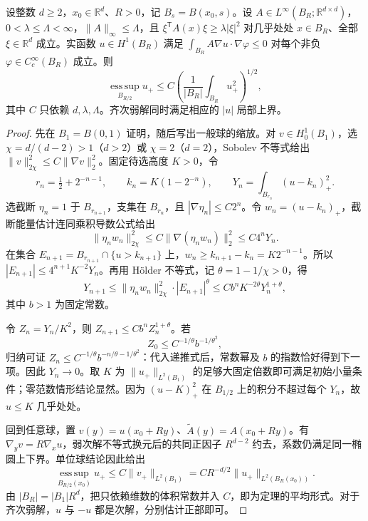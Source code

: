 \begin{theorem}[弱次解的局部上界]
\label{b2:thm:16-local-boundedness}
设整数 \(d\geq2\)，\(x_0\in\mathbb R^d\)、\(R>0\)，记 \(B_s=B(x_0,s)\)。设 \(A\in L^\infty(B_R;\mathbb R^{d\times d})\)，\(0<\lambda\leq\Lambda<\infty\)，\(\|A\|_\infty\leq\Lambda\)，且 \(\xi^{\mathsf T}A(x)\xi\geq\lambda|\xi|^2\) 对几乎处处 \(x\in B_R\)、全部 \(\xi\in\mathbb R^d\) 成立。实函数 \(u\in H^1(B_R)\) 满足 \(\int_{B_R}A\nabla u\cdot\nabla\varphi\leq0\) 对每个非负 \(\varphi\in C_c^\infty(B_R)\) 成立。则
\[\operatorname*{ess\,sup}_{B_{R/2}}u_+
 \le C\left(\frac1{|B_R|}\int_{B_R}u_+^2\right)^{1/2},\]
其中 \(C\) 只依赖 \(d,\lambda,\Lambda\)。齐次弱解同时满足相应的 \(|u|\) 局部上界。
\end{theorem}
\begin{proof}
先在 \(B_1=B(0,1)\) 证明，随后写出一般球的缩放。对 \(v\in H_0^1(B_1)\)，选 \(\chi=d/(d-2)>1\)（\(d>2\)）或 \(\chi=2\)（\(d=2\)），Sobolev 不等式给出 \(\lVert v\rVert_{2\chi}^2\le C\lVert\nabla v\rVert_2^2\)。固定待选高度 \(K>0\)，令
\[r_n=\tfrac12+2^{-n-1},\qquad k_n=K(1-2^{-n}),\qquad
 Y_n=\int_{B_{r_n}}(u-k_n)_+^2.\]
选截断 \(\eta_n=1\) 于 \(B_{r_{n+1}}\)，支集在 \(B_{r_n}\)，且 \(|\nabla\eta_n|\le C2^n\)。令 \(w_n=(u-k_n)_+\)，截断能量估计连同乘积导数公式给出
\[\lVert\eta_nw_n\rVert_{2\chi}^2
 \le C\lVert\nabla(\eta_nw_n)\rVert_2^2\le C4^nY_n.\]
在集合 \(E_{n+1}=B_{r_{n+1}}\cap\{u>k_{n+1}\}\) 上，\(w_n\ge k_{n+1}-k_n=K2^{-n-1}\)。所以 \(|E_{n+1}|\le4^{n+1}K^{-2}Y_n\)。再用 Hölder 不等式，记 \(\theta=1-1/\chi>0\)，得
\[Y_{n+1}\le\lVert\eta_nw_n\rVert_{2\chi}^2\cdot|E_{n+1}|^\theta
 \le Cb^nK^{-2\theta}Y_n^{1+\theta},\]
其中 \(b>1\) 为固定常数。

令 \(Z_n=Y_n/K^2\)，则 \(Z_{n+1}\le Cb^nZ_n^{1+\theta}\)。若
\[Z_0\le C^{-1/\theta}b^{-1/\theta^2},\]
归纳可证 \(Z_n\le C^{-1/\theta}b^{-n/\theta-1/\theta^2}\)：代入递推式后，常数幂及 \(b\) 的指数恰好得到下一项。因此 \(Y_n\to0\)。取 \(K\) 为 \(\lVert u_+\rVert_{L^2(B_1)}\) 的足够大固定倍数即可满足初始小量条件；零范数情形结论显然。因为 \((u-K)_+^2\) 在 \(B_{1/2}\) 上的积分不超过每个 \(Y_n\)，故 \(u\le K\) 几乎处处。

回到任意球，置 \(v(y)=u(x_0+Ry)\)、\(\widetilde A(y)=A(x_0+Ry)\)。有 \(\nabla_yv=R\nabla_xu\)，弱次解不等式换元后的共同正因子 \(R^{d-2}\) 约去，系数仍满足同一椭圆上下界。单位球结论因此给出
\[
 \operatorname*{ess\,sup}_{B_{R/2}(x_0)}u_+
 \leq C\|v_+\|_{L^2(B_1)}
 =CR^{-d/2}\|u_+\|_{L^2(B_R(x_0))}.
\]
由 \(|B_R|=|B_1|R^d\)，把只依赖维数的体积常数并入 \(C\)，即为定理的平均形式。对于齐次弱解，\(u\) 与 \(-u\) 都是次解，分别估计正部即可。
\end{proof}

